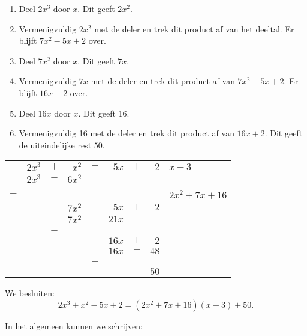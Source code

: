 \documentclass{ximera}
\begin{document}
\noindent
\begin{minipage}{.5\textwidth}
\begin{enumerate}
\item Deel $2x^3$ door $x$. Dit geeft $2x^2$.
\item Vermenigvuldig $2x^2$ met de deler en trek dit product af van het deeltal. Er blijft $7x^2-5x+2$ over.
\item Deel $7x^2$ door $x$. Dit geeft $7x$.
\item Vermenigvuldig $7x$ met de deler en trek dit product af van $7x^2-5x+2$. Er blijft $16x+2$ over.
\item Deel $16x$ door $x$. Dit geeft 16.
\item Vermenigvuldig 16 met de deler en trek dit product af van $16x+2$. Dit geeft de uiteindelijke rest $50$.
\end{enumerate}
\end{minipage}
\hspace{.7cm}
\begin{minipage}{.5\textwidth}
\begin{tabular}{r@{\;}r@{\;}c@{\;}r@{\;}c@{\;}r@{\;}c@{\;}r|l}
&$2x^3$&$+$&$x^2$&$-$&$5x$&$+$&$2$&$x-3$\\\cline{9-9}
&$2x^3$&$-$&$6x^2$&&&&&\\\cline{2-4}&&&&&&&&\\[-4.5ex]
$-$\hspace{2pt}&&&&&&&&$2x^2+7x+16$\\
&&&$7x^2$&$-$&$5x$&$+$&$2$&\\
&&&$7x^2$&$-$&$21x$&&&\\\cline{4-6}&&&&&&&&\\[-4.5ex]
&&$-$\hspace{2pt}&&&&\\
&&&&&$16x$&$+$&$2$&\\
&&&&&$16x$&$-$&$48$&\\\cline{6-8}&&&&&&&&\\[-4.5ex]
&&&&$-$\hspace{2pt}&&\\
&&&&&&&$50$&
\end{tabular}

\vspace{1cm}

We besluiten:\[2x^3+x^2-5x+2=(2x^2+7x+16)(x-3)+50.\]
\end{minipage}

\newpage

In het algemeen kunnen we schrijven:\nopagebreak
\end{document}
